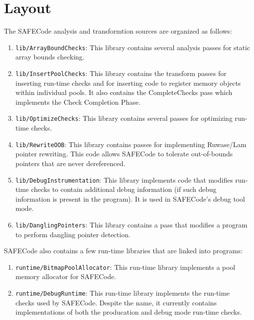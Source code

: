 \section{Layout}
\label{section:layout}

The SAFECode analysis and transformtion sources are organized as follows:

\begin{enumerate}
\item{{\tt lib/ArrayBoundChecks}:}
This library contains several analysis passes for static array bounds
checking.

\item{{\tt lib/InsertPoolChecks}:}
This library contains the transform passes for inserting run-time
checks and for inserting code to register memory objects within
individual pools.  It also contains the CompleteChecks pass which
implements the Check Completion Phase.

\item{{\tt lib/OptimizeChecks}:}
This library contains several passes for optimizing run-time checks.

\item{{\tt lib/RewriteOOB}:}
This library contains passes for implementing Ruwase/Lam pointer
rewriting.  This code allows SAFECode to tolerate out-of-bounds pointers
that are never dereferenced.

\item{{\tt lib/DebugInstrumentation}:}
This library implements code that modifies run-time checks to contain
additional debug information (if such debug information is present in the
program).  It is used in SAFECode's debug tool mode.

\item{{\tt lib/DanglingPointers}:}
This library contains a pass that modifies a program to perform
dangling pointer detection.
\end{enumerate}

SAFECode also contains a few run-time libraries that are linked into
programs:

\begin{enumerate}
\item{{\tt runtime/BitmapPoolAllocator}:}
This run-time library implements a pool memory allocator for SAFECode.

\item{{\tt runtime/DebugRuntime}:}
This run-time library implements the run-time checks used by SAFECode.
Despite the name, it currently contains implementations of both the
producation and debug mode run-time checks.
\end{enumerate}
